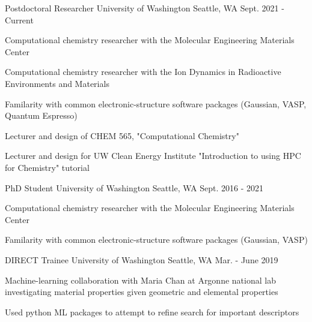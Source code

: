 

\begin{cventries}

 \cventry
   {Postdoctoral Researcher} %
   {University of Washington} %
   {Seattle, WA} %
   {Sept. 2021 - Current} %
   {
     \begin{cvitems} %
       \item {Computational chemistry researcher with the Molecular Engineering Materials Center}
       \item {Computational chemistry researcher with the Ion Dynamics in Radioactive Environments and Materials}
       \item {Familarity with common electronic-structure software packages (Gaussian, VASP, Quantum Espresso)}
       \item {Lecturer and design of CHEM 565, "Computational Chemistry"}
       \item {Lecturer and design for UW Clean Energy Institute "Introduction to using HPC for Chemistry" tutorial}
     \end{cvitems}
   }

 \cventry
   {PhD Student} %
   {University of Washington} %
   {Seattle, WA} %
   {Sept. 2016 - 2021} %
   {
     \begin{cvitems} %
       \item {Computational chemistry researcher with the Molecular Engineering Materials Center}
       \item {Familarity with common electronic-structure software packages (Gaussian, VASP)}
     \end{cvitems}
   }

 \cventry
   {DIRECT Trainee} %
   {University of Washington} %
   {Seattle, WA} %
   {Mar. - June 2019} %
   {
     \begin{cvitems} %
       \item {Machine-learning collaboration with Maria Chan at Argonne national lab investigating material properties given geometric and elemental properties}
       \item {Used python ML packages to attempt to refine search for important descriptors}
     \end{cvitems}
   }


\end{cventries}
